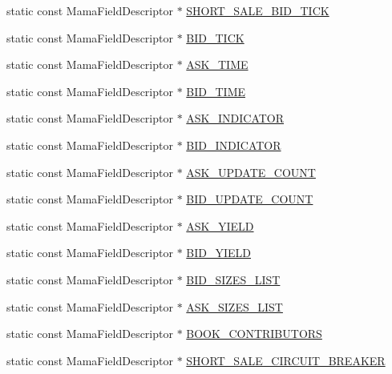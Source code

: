 \begin{CompactItemize}
\item 
static const Mama\-Field\-Descriptor $\ast$ \hyperlink{classWombat_1_1MamdaQuoteFields_59af90098dfc8645f7245206e60cb2f3}{SHORT\_\-SALE\_\-BID\_\-TICK}
\item 
static const Mama\-Field\-Descriptor $\ast$ \hyperlink{classWombat_1_1MamdaQuoteFields_9a0ee34301e6c4342b0794a8f40fa966}{BID\_\-TICK}
\item 
static const Mama\-Field\-Descriptor $\ast$ \hyperlink{classWombat_1_1MamdaQuoteFields_cec1d9a4370890999088b3c2cff4b345}{ASK\_\-TIME}
\item 
static const Mama\-Field\-Descriptor $\ast$ \hyperlink{classWombat_1_1MamdaQuoteFields_0ac3eb35a7e7cfe8b7f0e68814d8897b}{BID\_\-TIME}
\item 
static const Mama\-Field\-Descriptor $\ast$ \hyperlink{classWombat_1_1MamdaQuoteFields_709c3f4703f1e77aebc8f9b82dabe12e}{ASK\_\-INDICATOR}
\item 
static const Mama\-Field\-Descriptor $\ast$ \hyperlink{classWombat_1_1MamdaQuoteFields_9c72a8619b58f23db3eda6cd9e11d576}{BID\_\-INDICATOR}
\item 
static const Mama\-Field\-Descriptor $\ast$ \hyperlink{classWombat_1_1MamdaQuoteFields_fbb1fb196de02f1f1364ddea384fe906}{ASK\_\-UPDATE\_\-COUNT}
\item 
static const Mama\-Field\-Descriptor $\ast$ \hyperlink{classWombat_1_1MamdaQuoteFields_e8e38774b6bfc91c4d4853f22f325d1d}{BID\_\-UPDATE\_\-COUNT}
\item 
static const Mama\-Field\-Descriptor $\ast$ \hyperlink{classWombat_1_1MamdaQuoteFields_fd833cc0c02a851badc645209b715937}{ASK\_\-YIELD}
\item 
static const Mama\-Field\-Descriptor $\ast$ \hyperlink{classWombat_1_1MamdaQuoteFields_85ba030401ca9cbe0c2353a4439e620f}{BID\_\-YIELD}
\item 
static const Mama\-Field\-Descriptor $\ast$ \hyperlink{classWombat_1_1MamdaQuoteFields_c2014e36dfa9750831535737715ef608}{BID\_\-SIZES\_\-LIST}
\item 
static const Mama\-Field\-Descriptor $\ast$ \hyperlink{classWombat_1_1MamdaQuoteFields_3afeb45bd724abdd29aeee21c30b7c4f}{ASK\_\-SIZES\_\-LIST}
\item 
static const Mama\-Field\-Descriptor $\ast$ \hyperlink{classWombat_1_1MamdaQuoteFields_1fd00e0abec6f595e2139efa75ca9556}{BOOK\_\-CONTRIBUTORS}
\item 
static const Mama\-Field\-Descriptor $\ast$ \hyperlink{classWombat_1_1MamdaQuoteFields_509b04d7924b4417eceb403ac34fcc57}{SHORT\_\-SALE\_\-CIRCUIT\_\-BREAKER}
\end{CompactItemize}


